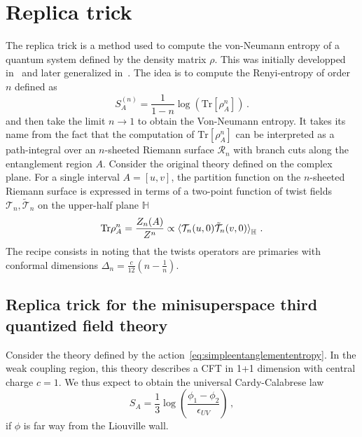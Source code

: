 \documentclass[a4paper]{article}
\begin{document}
\appendix
\section{Replica trick}
The replica trick is a method used to compute the von-Neumann entropy of a quantum system defined by the density matrix $\rho$. This was initially developped in~\cite{Callan_1994}\cite{Holzhey_1994} and later generalized in~\cite{Calabrese_2009}. The idea is to compute the Renyi-entropy of order $n$ defined as
\begin{equation}
  S_A^{(n)} = \frac{1}{1-n}\log\left(\text{Tr}\left[\rho_A^n\right]\right)\,.
\end{equation}
and then take the limit $n\to1$ to obtain the Von-Neumann entropy. It takes its name from the fact that the computation of $\text{Tr}\left[\rho_A^n\right]$ can be interpreted as a path-integral over an $n$-sheeted Riemann surface $\mathcal{R}_n$ with branch cuts along the entanglement region $A$. Consider the original theory defined on the complex plane. For a single interval $A=[u,v]$, the partition function on the $n$-sheeted Riemann surface is expressed in terms of a two-point function of twist fields $\mathcal{T}_{n},\mathcal{\tilde{T}}_{n}$ on the upper-half plane $\mathbb{H}$
\begin{equation}
  \text{Tr}\rho_A^n = \frac{Z_n(A)}{Z^n} \propto \braket{\mathcal{T}_{n}(u,0)\mathcal{\tilde{T}}_{n}(v,0)}_{\mathbb{H}}\,.
\end{equation}
The recipe consists in noting that the twists operators are primaries with conformal dimensions $\Delta_{n} = \frac{c}{12}\left(n-\frac{1}{n}\right)$. 

\subsection{Replica trick for the minisuperspace third quantized field theory}
Consider the theory defined by the action~\eqref{eq:simpleentanglemententropy}. In the weak coupling region, this theory describes a CFT in 1+1 dimension with central charge $c=1$. We thus expect to obtain the universal Cardy-Calabrese law
\begin{equation}
  S_{A} = \frac{1}{3}\log\left(\frac{\phi_1-\phi_2}{\epsilon_{UV}}\right)\,,
\end{equation}
if $\phi$ is far way from the Liouville wall. 
\end{document}
